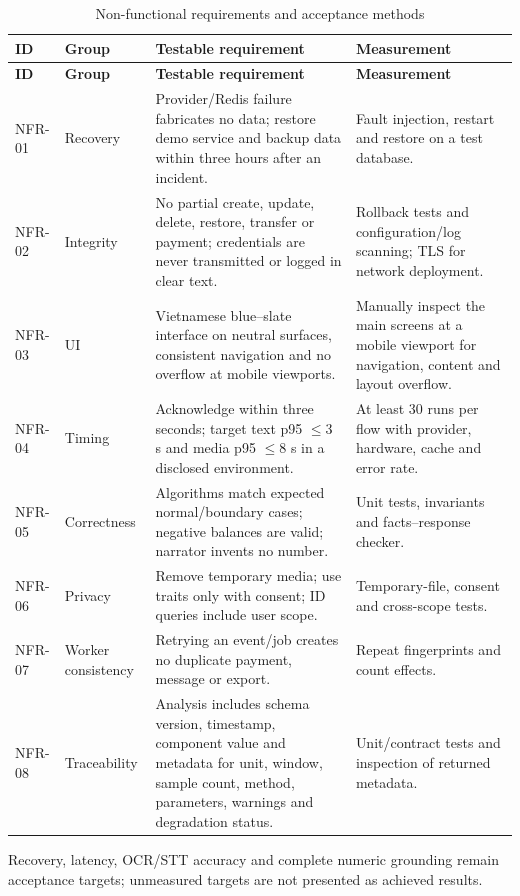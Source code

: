 \begin{longtable}{@{}L{1.3cm}L{3.0cm}L{5.8cm}L{3.8cm}@{}}
  \caption{Non-functional requirements and acceptance methods}\label{tab:nfr}\\
  \toprule
  \textbf{ID} & \textbf{Group} & \textbf{Testable requirement} & \textbf{Measurement} \\
  \midrule
  \endfirsthead
  \toprule
  \textbf{ID} & \textbf{Group} & \textbf{Testable requirement} & \textbf{Measurement} \\
  \midrule
  \endhead
  NFR-01 & Recovery & Provider/Redis failure fabricates no data; restore demo service and backup data within three hours after an incident. & Fault injection, restart and restore on a test database. \\
  NFR-02 & Integrity & No partial create, update, delete, restore, transfer or payment; credentials are never transmitted or logged in clear text. & Rollback tests and configuration/log scanning; TLS for network deployment. \\
  NFR-03 & UI & Vietnamese blue--slate interface on neutral surfaces, consistent navigation and no overflow at mobile viewports. & Manually inspect the main screens at a mobile viewport for navigation, content and layout overflow. \\
  NFR-04 & Timing & Acknowledge within three seconds; target text p95 $\leq3$ s and media p95 $\leq8$ s in a disclosed environment. & At least 30 runs per flow with provider, hardware, cache and error rate. \\
  NFR-05 & Correctness & Algorithms match expected normal/boundary cases; negative balances are valid; narrator invents no number. & Unit tests, invariants and facts--response checker. \\
  NFR-06 & Privacy & Remove temporary media; use traits only with consent; ID queries include user scope. & Temporary-file, consent and cross-scope tests. \\
  NFR-07 & Worker consistency & Retrying an event/job creates no duplicate payment, message or export. & Repeat fingerprints and count effects. \\
  NFR-08 & Traceability & Analysis includes schema version, timestamp, component value and metadata for unit, window, sample count, method, parameters, warnings and degradation status. & Unit/contract tests and inspection of returned metadata. \\
  \bottomrule
\end{longtable}

Recovery, latency, OCR/STT accuracy and complete numeric grounding remain acceptance targets; unmeasured targets are not presented as achieved results.

